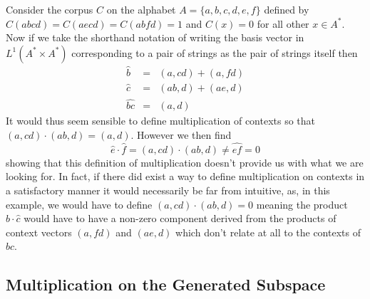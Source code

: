 \documentclass[11pt]{report}
\begin{document}
Consider the corpus $C$ on the alphabet $A = \{a,b,c,d,e,f\}$ defined by $C(abcd) = C(aecd) = C(abfd) = 1$ and $C(x) = 0$ for all other $x \in A^*$. Now if we take the shorthand notation of writing the basis vector in $L^1(A^*\times A^*)$ corresponding to a pair of strings as the pair of strings itself then
\begin{eqnarray*}
\hat{b} &=& (a,cd) + (a,fd)\\
\hat{c} &=& (ab,d) + (ae,d)\\
\widehat{bc} &=& (a,d)
\end{eqnarray*}
%
%
It would thus seem sensible to define multiplication of contexts so that $(a,cd)\cdot (ab,d) = (a,d)$. However we then find
$$\hat{e}\cdot \hat{f} = (a,cd)\cdot (ab,d) \neq \widehat{ef} = 0$$
showing that this definition of multiplication doesn't provide us with what we are looking for. In fact, if there did exist a way to define multiplication on contexts in a satisfactory manner it would necessarily be far from intuitive, as, in this example, we would have to define $(a,cd)\cdot (ab,d) = 0$ meaning the product $\hat{b}\cdot\hat{c}$ would have to have a non-zero component derived from the products of context vectors $(a,fd)$ and $(ae,d)$ which don't relate at all to the contexts of $bc$.


\subsection{Multiplication on the Generated Subspace}
\end{document}
